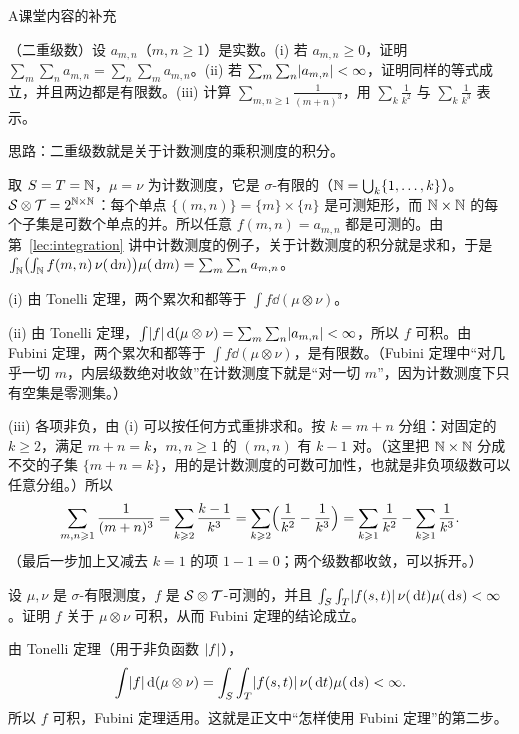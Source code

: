 
\begin{exercises}{A}{课堂内容的补充}
\item\label{ex:product:A1} （二重级数）设 $a_{m,n}$（$m,n\geqslant1$）是实数。(i) 若 $a_{m,n}\geqslant0$，证明 $\sum_m\sum_na_{m,n}=\sum_n\sum_ma_{m,n}$。(ii) 若 $\sum_m\sum_n\lvert a_{m,n}\rvert<\infty$，证明同样的等式成立，并且两边都是有限数。(iii) 计算 $\sum_{m,n\geqslant1}\frac1{(m+n)^3}$，用 $\sum_k\frac1{k^2}$ 与 $\sum_k\frac1{k^3}$ 表示。
\begin{solution}
思路：二重级数就是关于计数测度的乘积测度的积分。

取 $S=T=\mathbb{N}$，$\mu=\nu$ 为计数测度，它是 $\sigma$-有限的（$\mathbb{N}=\bigcup_k\{1,\dots,k\}$）。$\mathcal{S}\otimes\mathcal{T}=2^{\mathbb{N}\times\mathbb{N}}$：每个单点 $\{(m,n)\}=\{m\}\times\{n\}$ 是可测矩形，而 $\mathbb{N}\times\mathbb{N}$ 的每个子集是可数个单点的并。所以任意 $f(m,n)=a_{m,n}$ 都是可测的。由第~\ref{lec:integration} 讲中计数测度的例子，关于计数测度的积分就是求和，于是 $\int_{\mathbb{N}}\bigl(\int_{\mathbb{N}} f(m,n)\,\nu(\,\mathrm{d} n)\bigr)\mu(\,\mathrm{d} m)=\sum_m\sum_na_{m,n}$。

(i) 由 Tonelli 定理，两个累次和都等于 $\int f\dd(\mu\otimes\nu)$。

(ii) 由 Tonelli 定理，$\int\lvert f\rvert\,\mathrm{d}(\mu\otimes\nu)=\sum_m\sum_n\lvert a_{m,n}\rvert<\infty$，所以 $f$ 可积。由 Fubini 定理，两个累次和都等于 $\int f\dd(\mu\otimes\nu)$，是有限数。（Fubini 定理中“对几乎一切 $m$，内层级数绝对收敛”在计数测度下就是“对一切 $m$”，因为计数测度下只有空集是零测集。）

(iii) 各项非负，由 (i) 可以按任何方式重排求和。按 $k=m+n$ 分组：对固定的 $k\geqslant2$，满足 $m+n=k$，$m,n\geqslant1$ 的 $(m,n)$ 有 $k-1$ 对。（这里把 $\mathbb{N}\times\mathbb{N}$ 分成不交的子集 $\{m+n=k\}$，用的是计数测度的可数可加性，也就是非负项级数可以任意分组。）所以
\[
\sum_{m,n\geqslant1}\frac1{(m+n)^3}=\sum_{k\geqslant2}\frac{k-1}{k^3}=\sum_{k\geqslant2}\Bigl(\frac1{k^2}-\frac1{k^3}\Bigr)=\sum_{k\geqslant1}\frac1{k^2}-\sum_{k\geqslant1}\frac1{k^3}.
\]
（最后一步加上又减去 $k=1$ 的项 $1-1=0$；两个级数都收敛，可以拆开。）
\end{solution}

\item\label{ex:product:A2} 设 $\mu,\nu$ 是 $\sigma$-有限测度，$f$ 是 $\mathcal{S}\otimes\mathcal{T}$-可测的，并且 $\int_S\int_T\lvert f(s,t)\rvert\,\nu(\,\mathrm{d} t)\mu(\,\mathrm{d} s)<\infty$。证明 $f$ 关于 $\mu\otimes\nu$ 可积，从而 Fubini 定理的结论成立。
\begin{solution}
由 Tonelli 定理（用于非负函数 $\lvert f\rvert$），
\[
\int\lvert f\rvert\,\mathrm{d}(\mu\otimes\nu)=\int_S\int_T\lvert f(s,t)\rvert\,\nu(\,\mathrm{d} t)\mu(\,\mathrm{d} s)<\infty .
\]
所以 $f$ 可积，Fubini 定理适用。这就是正文中“怎样使用 Fubini 定理”的第二步。
\end{solution}


\end{exercises}
